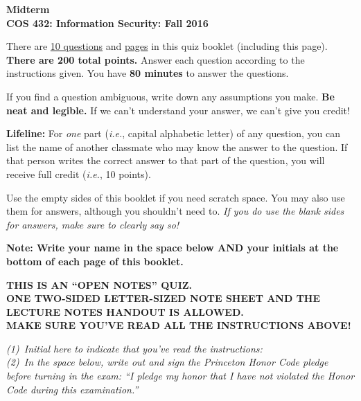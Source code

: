 \documentclass[11pt]{article}
\newcommand{\ie}{{\em i.e.}}
\newcounter{answer}
\begin{document}
\begin{center}
{\LARGE{\bf Midterm}} \\
\vspace{.15in}
{\Large{\bf COS 432: Information Security: Fall 2016}} \\
\vspace{.2in}

\begin{boxedminipage}[h]{6in}
  There are \underline{10 questions} and \underline{\pageref{lastpage}
    pages} in this quiz booklet (including this page). {\bf There are
    200 total points.}  Answer each question according to the
  instructions given.  You have {\bf 80 minutes} to answer the
  questions.

\vspace{.1in} 
If you find a question ambiguous, write down any
assumptions you make.  {\bf Be neat and legible.}  If we can't
understand your answer, we can't give you credit!  

\vspace*{.1in} {\bf Lifeline:} For {\em one} part (\ie, capital
alphabetic letter) of any question, you can list the name of another
classmate who may know the answer to the question. If that person writes
the correct answer to that part of the question, you will receive full
credit (\ie, 10 points). 

\vspace{.1in} 
Use the empty sides of this booklet if you need scratch space.  You
may also use them for answers, although you shouldn't need to.  {\em If you
do use the blank sides for answers, make sure to clearly say so!}

\vspace{.1in} 
{\bf Note: Write your name in the space below AND your initials at the bottom of each
page of this booklet.}

\begin{center}{\bf THIS IS AN ``OPEN NOTES'' QUIZ.\\
ONE TWO-SIDED LETTER-SIZED NOTE SHEET AND THE LECTURE NOTES HANDOUT IS
ALLOWED. \\ 
MAKE SURE YOU'VE READ ALL THE INSTRUCTIONS ABOVE!}
\end{center}
{\em (1)~Initial here to indicate that you've read the instructions: \\ 
(2)~In the space below, write out and sign the Princeton Honor Code pledge before 
turning in the exam: ``I pledge my honor that I have not violated the Honor Code during this examination.'' }
\vspace{0.5in}
\\



\end{boxedminipage}
\end{center}
\end{document}
